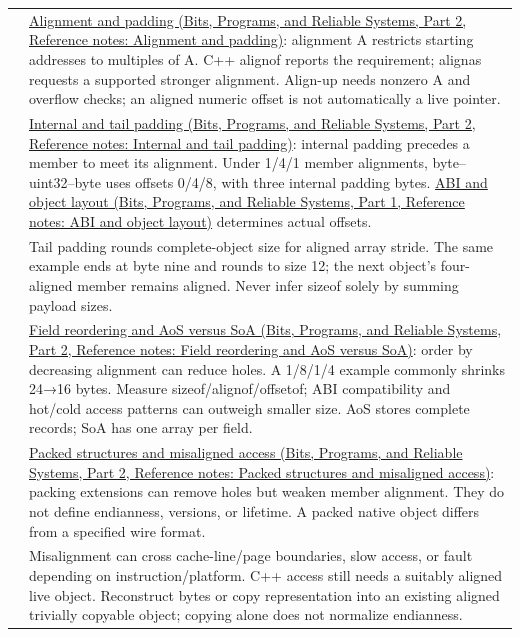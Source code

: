 {\begin{longtable}[]{@{}
  >{\raggedright\arraybackslash}p{}
  >{\raggedright\arraybackslash}p{}@{}}
45 & \href{../01-Bits-Programs-and-Reliable-Systems-P02/main.pdf\#nameddest=appendix-a1f7c53b4742}{Alignment and padding (Bits, Programs, and Reliable Systems, Part 2, Reference notes: Alignment and padding)}: alignment A restricts starting addresses to multiples of A. C++ alignof reports the requirement; alignas requests a supported stronger alignment. Align-up needs nonzero A and overflow checks; an aligned numeric offset is not automatically a live pointer. \\
46 & \href{../01-Bits-Programs-and-Reliable-Systems-P02/main.pdf\#nameddest=appendix-f52f8c5a3afd}{Internal and tail padding (Bits, Programs, and Reliable Systems, Part 2, Reference notes: Internal and tail padding)}: internal padding precedes a member to meet its alignment. Under 1/4/1 member alignments, byte--uint32--byte uses offsets 0/4/8, with three internal padding bytes. \href{../01-Bits-Programs-and-Reliable-Systems-P01/main.pdf\#nameddest=appendix-c4ac6bb0fff8}{ABI and object layout (Bits, Programs, and Reliable Systems, Part 1, Reference notes: ABI and object layout)} determines actual offsets. \\
47 & Tail padding rounds complete-object size for aligned array stride. The same example ends at byte nine and rounds to size 12; the next object's four-aligned member remains aligned. Never infer sizeof solely by summing payload sizes. \\
48 & \href{../01-Bits-Programs-and-Reliable-Systems-P02/main.pdf\#nameddest=appendix-5522ad176ca0}{Field reordering and AoS versus SoA (Bits, Programs, and Reliable Systems, Part 2, Reference notes: Field reordering and AoS versus SoA)}: order by decreasing alignment can reduce holes. A 1/8/1/4 example commonly shrinks 24→16 bytes. Measure sizeof/alignof/offsetof; ABI compatibility and hot/cold access patterns can outweigh smaller size. AoS stores complete records; SoA has one array per field. \\
49 & \href{../01-Bits-Programs-and-Reliable-Systems-P02/main.pdf\#nameddest=appendix-0682dbfc5f0e}{Packed structures and misaligned access (Bits, Programs, and Reliable Systems, Part 2, Reference notes: Packed structures and misaligned access)}: packing extensions can remove holes but weaken member alignment. They do not define endianness, versions, or lifetime. A packed native object differs from a specified wire format. \\
50 & Misalignment can cross cache-line/page boundaries, slow access, or fault depending on instruction/platform. C++ access still needs a suitably aligned live object. Reconstruct bytes or copy representation into an existing aligned trivially copyable object; copying alone does not normalize endianness. \\

\end{longtable}}
